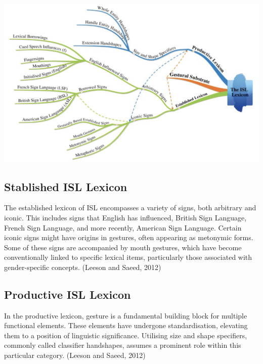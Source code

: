 \includegraphics[width=\textwidth]{figures/lexicon.png}



\subsection{Stablished ISL Lexicon}

The established lexicon of ISL encompasses a variety of signs, both arbitrary and iconic. This includes signs that English has influenced, British Sign Language, French Sign Language, and more recently, American Sign Language. Certain iconic signs might have origins in gestures, often appearing as metonymic forms. Some of these signs are accompanied by mouth gestures, which have become conventionally linked to specific lexical items, particularly those associated with gender-specific concepts. (Leeson and Saeed, 2012)

\subsection{Productive ISL Lexicon}

In the productive lexicon, gesture is a fundamental building block for multiple functional elements. These elements have undergone standardisation, elevating them to a position of linguistic significance. Utilising size and shape specifiers, commonly called classifier handshapes, assumes a prominent role within this particular category. (Leeson and Saeed, 2012)









